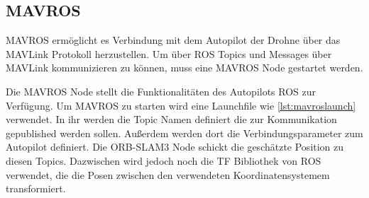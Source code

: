 \subsection{MAVROS}

MAVROS ermöglicht es Verbindung mit dem Autopilot der Drohne über das MAVLink Protokoll herzustellen. Um über ROS Topics und Messages über MAVLink kommunizieren zu können, muss eine MAVROS Node gestartet werden.

Die MAVROS Node stellt die Funktionalitäten des Autopilots \ac{ROS} zur Verfügung. Um MAVROS zu starten wird eine Launchfile wie \ref{lst:mavroslaunch} verwendet. In ihr werden die Topic Namen definiert die zur Kommunikation gepublished werden sollen. Außerdem werden dort die Verbindungsparameter zum Autopilot definiert. Die ORB-SLAM3 Node schickt die geschätzte Position zu diesen Topics. Dazwischen wird jedoch noch die \ac{TF} Bibliothek von \ac{ROS} verwendet, die die Posen zwischen den verwendeten Koordinatensystemem transformiert. 




